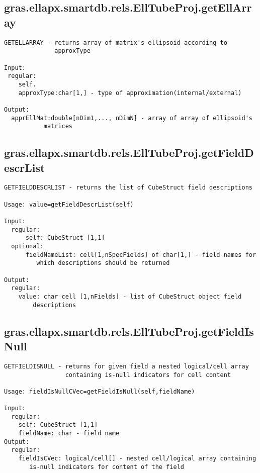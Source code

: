 \subsection{\texorpdfstring{gras.ellapx.smartdb.rels.EllTubeProj.getEllArray}{getEllArray}}\label{method:gras.ellapx.smartdb.rels.EllTubeProj.getEllArray}
\begin{verbatim}
GETELLARRAY - returns array of matrix's ellipsoid according to
              approxType

Input:
 regular:
    self.
    approxType:char[1,] - type of approximation(internal/external)

Output:
  apprEllMat:double[nDim1,..., nDimN] - array of array of ellipsoid's
           matrices
\end{verbatim}
\subsection{\texorpdfstring{gras.ellapx.smartdb.rels.EllTubeProj.getFieldDescrList}{getFieldDescrList}}\label{method:gras.ellapx.smartdb.rels.EllTubeProj.getFieldDescrList}
\begin{verbatim}
GETFIELDDESCRLIST - returns the list of CubeStruct field descriptions

Usage: value=getFieldDescrList(self)

Input:
  regular:
      self: CubeStruct [1,1]
  optional:
      fieldNameList: cell[1,nSpecFields] of char[1,] - field names for
         which descriptions should be returned

Output:
  regular:
    value: char cell [1,nFields] - list of CubeStruct object field
        descriptions
\end{verbatim}
\subsection{\texorpdfstring{gras.ellapx.smartdb.rels.EllTubeProj.getFieldIsNull}{getFieldIsNull}}\label{method:gras.ellapx.smartdb.rels.EllTubeProj.getFieldIsNull}
\begin{verbatim}
GETFIELDISNULL - returns for given field a nested logical/cell array
                 containing is-null indicators for cell content

Usage: fieldIsNullCVec=getFieldIsNull(self,fieldName)

Input:
  regular:
    self: CubeStruct [1,1]
    fieldName: char - field name
Output:
  regular:
    fieldIsCVec: logical/cell[] - nested cell/logical array containing
       is-null indicators for content of the field
\end{verbatim}
